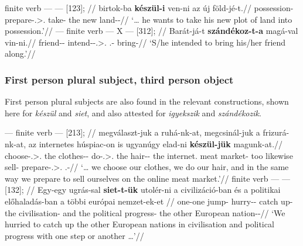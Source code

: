 \ex\label{ex:birtok}%
    \begingl
        \glpreamble finite verb --- \Inf{} --- \Obj{} [123]; //
        \gla 	\nogloss{\dots} birtok-ba \textbf{készül-i} ven-ni az új föld-jé-t.//
        \glb 	possession-\Ill{} prepare-\Tsg.\Sbj>\Third.\Obj{} take-\Inf{} the new land-\Tsg-\Acc//
        \glft 	\enquote*{\dots{} he wants to take his new plot of land into possession.}\trailingcitation{}//
    \endgl
\xe
\ex\label{ex:barat-szandek}%
    \begingl
        \glpreamble \Obj{} --- finite verb --- X --- \Inf{} [312]; //
        \gla 	Barát-já-t \textbf{szándékoz-t-a} magá-val vin-ni.//
        \glb 	friend-\Tsg-\Acc{} intend-\Pst-\Tsg.\Sbj>\Third.\Obj{} \Refl.\Tsg{}-\Com{} bring-\Inf{}//
        \glft 	\enquote*{S/he intended to bring his/her friend along.}//
    \endgl
\xe

\subsubsection{First person plural subject, third person object}\label{sub:1pl-3}

First person plural subjects are also found in the relevant constructions,
shown here for \emph{készül} and \emph{siet}, and also attested for
\emph{igyekszik} and \emph{szándékozik}.

\ex\label{ex:meat-market}%
    \begingl
        \glpreamble \Inf --- finite verb --- \Obj{} [213]; //
        \gla 	\nogloss{\dots} megválaszt-juk a ruhá-nk-at, megcsinál-juk a
        frizurá-nk-at, az internetes húspiac-on is ugyanúgy elad-ni
        \textbf{készül-jük} magunk-at.//
        \glb 	choose-\Fpl.\Sbj>\Third.\Obj{} the clothes-\Fpl-\Acc{} do-\Fpl.\Sbj>\Third.\Obj{} the hair-\Fpl-\Acc{} the internet.\Adj{} {meat market}-\Supe{} too likewise sell-\Inf{} prepare-\Fpl.\Sbj>\Third.\Obj{} \Refl.\Fpl-\Acc//
        \glft 	\enquote*{\dots{} we choose our clothes, we do our hair, and in the same way we prepare to sell ourselves on the online meat market.}\trailingcitation{}//
    \endgl
\xe
\ex\label{ex:siet-civilizacio}
    \begingl
        \glpreamble finite verb --- \Inf{} --- \Obj{} [132]; //
        \gla 	Egy-egy ugrás-sal \textbf{siet-t-ük} utolér-ni a civilizáció-ban és a politikai előhaladás-ban a többi európai nemzet-ek-et \nogloss{\dots}//
        \glb 	one-one jump-\Com{} hurry-\Pst-\Fpl{} {catch up}-\Inf{} the civilisation-\Ine{} and the political progress-\Ine{} the other European nation-\Pl-\Acc{}//
        \glft 	\enquote*{We hurried to catch up the other European nations in
        civilisation and political progress with one step or another \dots}//
    \endgl
\xe

